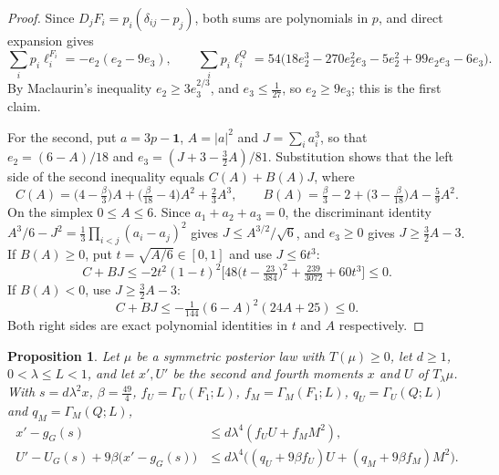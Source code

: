 \documentclass[11pt]{amsart}
\newtheorem{proposition}[theorem]{Proposition}
\theoremstyle{definition}
\theoremstyle{remark}
\newcommand{\one}{\mathbf{1}}
\begin{document}
\begin{proof}
Since $D_jF_i=p_i(\delta_{ij}-p_j)$, both sums are polynomials in $p$, and direct expansion gives
\[
\sum_ip_i\ell_i^{F_i}=-e_2(e_2-9e_3),\qquad
\sum_ip_i\ell_i^{Q}=54\big(18e_2^3-270e_2^2e_3-5e_2^2+99e_2e_3-6e_3\big).
\]
By Maclaurin's inequality $e_2\ge3e_3^{2/3}$, and $e_3\le\tfrac1{27}$, so $e_2\ge9e_3$; this is the first claim.

For the second, put $a=3p-\one$, $A=|a|^2$ and $J=\sum_ia_i^3$, so that $e_2=(6-A)/18$ and
$e_3=(J+3-\tfrac32A)/81$. Substitution shows that the left side of the second inequality equals $C(A)+B(A)J$, where
\[
C(A)=\big(4-\tfrac\beta3\big)A+\big(\tfrac\beta{18}-4\big)A^2+\tfrac23A^3,\qquad
B(A)=\tfrac\beta3-2+\big(3-\tfrac\beta{18}\big)A-\tfrac59A^2.
\]
On the simplex $0\le A\le6$. Since $a_1+a_2+a_3=0$, the discriminant identity
$A^3/6-J^2=\tfrac13\prod_{i<j}(a_i-a_j)^2$ gives $J\le A^{3/2}/\sqrt6$, and $e_3\ge0$ gives $J\ge\tfrac32A-3$.
If $B(A)\ge0$, put $t=\sqrt{A/6}\in[0,1]$ and use $J\le6t^3$:
\[
C+BJ\le-2t^2(1-t)^2\Big[48\big(t-\tfrac{23}{384}\big)^2+\tfrac{239}{3072}+60t^3\Big]\le0.
\]
If $B(A)<0$, use $J\ge\tfrac32A-3$:
\[
C+BJ\le-\tfrac1{144}(6-A)^2(24A+25)\le0.
\]
Both right sides are exact polynomial identities in $t$ and $A$ respectively.
\end{proof}

\begin{proposition}\label{prop:compare}
Let $\mu$ be a symmetric posterior law with $T(\mu)\ge0$, let $d\ge1$, $0<\lambda\le L<1$, and let $x',U'$ be the
second and fourth moments $x$ and $U$ of $T_\lambda\mu$. With $s=d\lambda^2x$, $\beta=\tfrac{49}4$,
$f_U=\Gamma_U(F_1;L)$, $f_M=\Gamma_M(F_1;L)$, $q_U=\Gamma_U(Q;L)$ and $q_M=\Gamma_M(Q;L)$,
\begin{align}
x'-g_G(s)&\le d\lambda^4(f_UU+f_MM^2),\label{eq:cmp1}\\
U'-U_G(s)+9\beta\big(x'-g_G(s)\big)&\le d\lambda^4\big((q_U+9\beta f_U)U+(q_M+9\beta f_M)M^2\big).\label{eq:cmp2}
\end{align}
\end{proposition}
\end{document}
